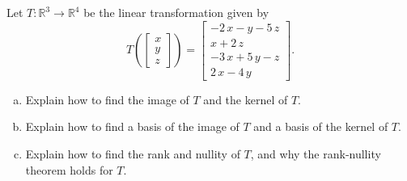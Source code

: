 
\begin{exerciseStatement}
 Let \(T:\mathbb{R}^ 3  \to \mathbb{R}^ 4 \) be the linear transformation given by \[T\left(  \left[\begin{array}{c}
x \\
y \\
z
\end{array}\right]  \right) =  \left[\begin{array}{c}
-2 \, x - y - 5 \, z \\
x + 2 \, z \\
-3 \, x + 5 \, y - z \\
2 \, x - 4 \, y
\end{array}\right] .\]
\begin{enumerate}[(a)]
\item Explain how to find the image of \(T\) and the kernel of \(T\).
\item Explain how to find a basis of the image of \(T\) and a basis of the kernel of \(T\).
\item Explain how to find the rank and nullity of \(T\), and why the rank-nullity theorem holds for \(T\).
\end{enumerate}
    
\end{exerciseStatement}
    
